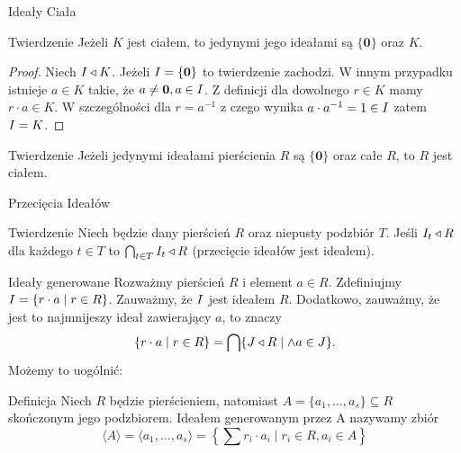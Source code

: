 \documentclass{beamer}
\newcommand{\zero}{\mathbf{0}}
\newcommand{\II}{\mathnormal{I}}
\newcommand{\JJ}{\mathnormal{J}}
\begin{document}
\begin{frame}{Ideały Ciała}
    \begin{block}{Twierdzenie}
        Jeżeli $K$ jest ciałem, to jedynymi jego ideałami są $\{\zero\}$ oraz $K$.
    \end{block}
    \pause 
    \begin{proof}
        Niech $\II \triangleleft K$. Jeżeli $\II = \{\zero\}$ to twierdzenie zachodzi. W innym przypadku istnieje $a \in K$ takie, że $a \neq \zero, a \in \II$. Z definicji dla dowolnego $r \in K$ mamy $r \cdot a \in K$. W szczególności dla $r = a^{-1}$ z czego wynika $a \cdot a^{-1} = 1 \in \II$ zatem $\II = K$.
    \end{proof}
    \pause 
    \begin{block}{Twierdzenie}
        Jeżeli jedynymi ideałami pierścienia $R$ są $\{\zero\}$ oraz całe $R$, to $R$ jest ciałem. 
    \end{block}
\end{frame}

\begin{frame}{Przecięcia Ideałów}
    \begin{block}{Twierdzenie}
        Niech będzie dany pierścień $R$ oraz niepusty podzbiór $T$. 
        Jeśli $\II_t \triangleleft R$ dla każdego $t \in T$ to $\bigcap_{t \in T} \II_t \triangleleft R$
        (przecięcie ideałów jest ideałem).
    \end{block}
\end{frame}
\begin{frame}{Ideały generowane}
    Rozważmy pierścień $R$ i element $a \in R$. Zdefiniujmy $\II = \{ r \cdot a \mid r \in R\}$. Zauważmy, że $\II$ jest ideałem $R$. Dodatkowo, zauważmy, że jest to najmnijeszy ideał zawierający $a$, to znaczy
    $$\{r \cdot a \mid r \in R\} = \bigcap \{\JJ \triangleleft R \mid  \land a \in \JJ\}.$$
    \pause 
    Możemy to uogólnić:
    \begin{block}{Definicja}
        Niech $R$ będzie pierścieniem, natomiast $A = \{a_1, \ldots, a_s\} \subseteq R$ skończonym jego podzbiorem. 
        \alert{Ideałem generowanym przez A} nazywamy zbiór 
        $$\langle A \rangle = \langle a_1, \ldots , a_s \rangle = \left\{ \sum r_i \cdot a_i \mid r_i \in R, a_i \in A \right\}$$
    \end{block}
\end{frame}
\end{document}
